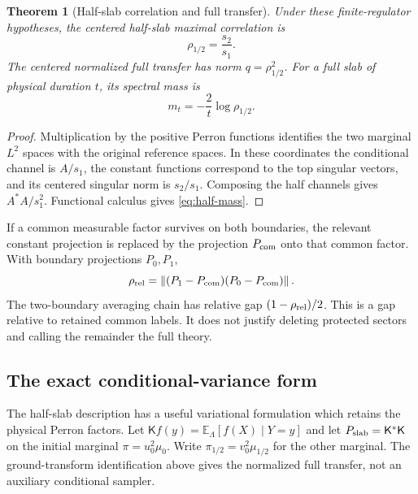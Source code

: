 \documentclass[11pt,oneside,openany]{book}
\newtheorem{theorem}{Theorem}[chapter]
\theoremstyle{definition}
\theoremstyle{remark}
\newcommand{\E}{\mathbb E}
\newcommand{\norm}[1]{\left\lVert#1\right\rVert}
\begin{document}
\begin{theorem}[Half-slab correlation and full transfer]\label{thm:half}
Under these finite-regulator hypotheses, the centered half-slab maximal correlation is
\[
\rho_{1/2}=\frac{s_2}{s_1}.
\]
The centered normalized full transfer has norm $q=\rho_{1/2}^2$. For a full slab of physical duration $t$, its spectral mass is
\begin{equation}\label{eq:half-mass}
m_t=-\frac{2}{t}\log\rho_{1/2}.
\end{equation}
\end{theorem}
\begin{proof}
Multiplication by the positive Perron functions identifies the two marginal $L^2$ spaces with the original reference spaces. In these coordinates the conditional channel is $A/s_1$, the constant functions correspond to the top singular vectors, and its centered singular norm is $s_2/s_1$. Composing the half channels gives $A^*A/s_1^2$. Functional calculus gives \cref{eq:half-mass}.
\end{proof}

If a common measurable factor survives on both boundaries, the relevant constant projection is replaced by the projection $P_{\rm com}$ onto that common factor. With boundary projections $P_0,P_1$,
\[
\rho_{\rm rel}=\norm{(P_1-P_{\rm com})(P_0-P_{\rm com})}.
\]
The two-boundary averaging chain has relative gap $(1-\rho_{\rm rel})/2$. This is a gap relative to retained common labels. It does not justify deleting protected sectors and calling the remainder the full theory.

\subsection{The exact conditional-variance form}
The half-slab description has a useful variational formulation which
retains the physical Perron factors. Let $\mathsf Kf(y)=\E_\Lambda[f(X)\mid
Y=y]$ and let $P_{\rm slab}=\mathsf K^*\mathsf K$ on the initial marginal
$\pi=u_0^2\mu_0$. Write $\pi_{1/2}=v_0^2\mu_{1/2}$ for the
other marginal. The ground-transform identification above gives the normalized
full transfer, not an auxiliary conditional sampler.
\end{document}
